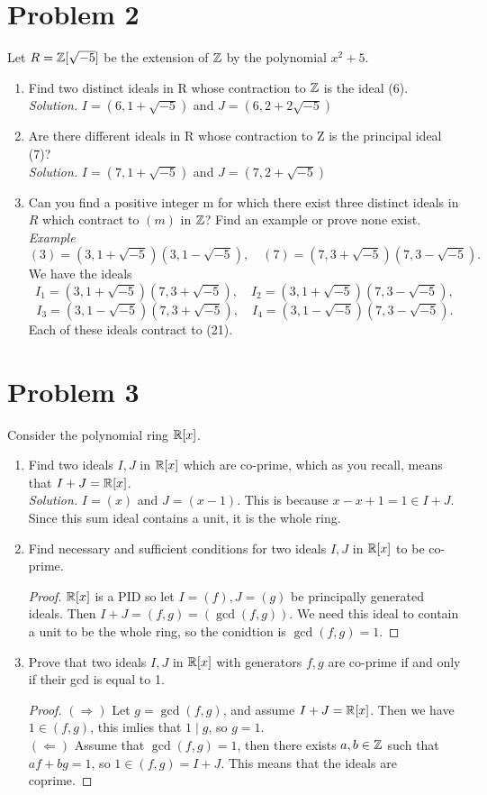 \documentclass[12pt]{article}
\begin{document}
\section*{Problem 2}
Let $R = \mathbb{Z}[\sqrt{-5}]$ be the extension of $\mathbb{Z}$ by the polynomial $x^2 + 5$.
\begin{enumerate}[label=(\alph*)]
    \item Find two distinct ideals in R whose contraction to $\mathbb{Z}$ is the ideal (6).\\
    \textit{Solution.} $I=(6,1+\sqrt{-5})$ and $J=(6,2+2\sqrt{-5})$
    \item Are there different ideals in R whose contraction to Z is the principal ideal (7)?\\
    \textit{Solution.} $I=(7,1+\sqrt{-5})$ and $J=(7,2+\sqrt{-5})$
    \item Can you find a positive integer m for which there exist three distinct ideals in $R$ which contract to $(m)$ in $\mathbb{Z}$? Find an example or prove none exist.\\
    \textit{Example}
	\[
		(3)=(3,1+\sqrt{-5})(3,1-\sqrt{-5}),\quad (7)=(7,3+\sqrt{-5})(7,3-\sqrt{-5}).
	\]
	We have the ideals
	\[
		I_1=(3,1+\sqrt{-5})(7,3+\sqrt{-5}),\quad I_2=(3,1+\sqrt{-5})(7,3-\sqrt{-5}),
	\]
	\[
		I_3=(3,1-\sqrt{-5})(7,3+\sqrt{-5}),\quad I_4=(3,1-\sqrt{-5})(7,3-\sqrt{-5}).
	\]
	Each of these ideals contract to (21).
\end{enumerate}

\section*{Problem 3}
Consider the polynomial ring $\mathbb{R}[x]$.
\begin{enumerate}[label=(\alph*)]
    \item Find two ideals $I, J$ in $\mathbb{R}[x]$ which are co-prime, which as you recall, means that $I + J = \mathbb{R}[x]$.\\
    \textit{Solution.} $I=(x)$ and $J=(x-1)$. This is because $x-x+1=1\in I+J$. Since this sum ideal contains a unit, it is the whole ring. 
    \item Find necessary and sufficient conditions for two ideals $I, J$ in $\mathbb{R}[x]$ to be co-prime.
    \begin{proof}
		$\mathbb{R}[x]$ is a PID so let $I=(f),J=(g)$ be principally generated ideals. Then $I+J=(f,g)=(\gcd(f,g))$. We need this ideal to contain a unit to be the whole ring, so the conidtion is $\gcd(f,g)=1$.
	\end{proof}
    \item Prove that two ideals $I, J$ in $\mathbb{R}[x]$ with generators $f, g$ are co-prime if and only if their gcd is equal to 1.
    \begin{proof}
		$(\Rightarrow)$ Let $g=\gcd(f,g)$, and assume $I+J=\mathbb{R}[x]$. Then we have $1\in(f,g)$, this imlies that $1\mid g$, so $g=1$.\\
		$(\Leftarrow)$ Assume that $\gcd(f,g)=1$, then there exists $a,b\in\mathbb{Z}$ such that $af+bg=1$, so $1\in(f,g)=I+J$. This means that the ideals are coprime. 
	\end{proof}
\end{enumerate}
\end{document}
